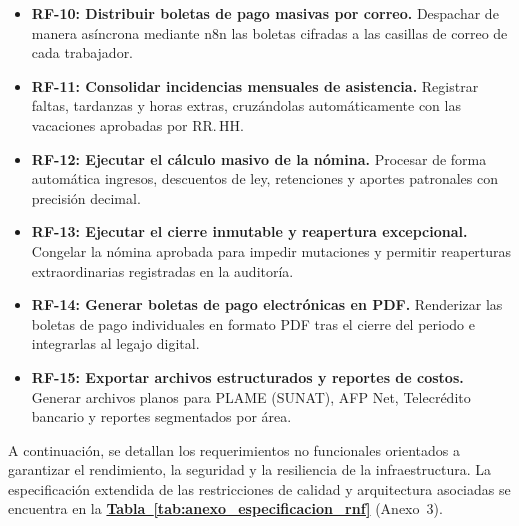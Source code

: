 \begin{itemize}
    \item \textbf{RF-10: Distribuir boletas de pago masivas por correo.} Despachar de manera asíncrona mediante n8n las boletas cifradas a las casillas de correo de cada trabajador.
    \item \textbf{RF-11: Consolidar incidencias mensuales de asistencia.} Registrar faltas, tardanzas y horas extras, cruzándolas automáticamente con las vacaciones aprobadas por RR.\,HH.
    \item \textbf{RF-12: Ejecutar el cálculo masivo de la nómina.} Procesar de forma automática ingresos, descuentos de ley, retenciones y aportes patronales con precisión decimal.
    \item \textbf{RF-13: Ejecutar el cierre inmutable y reapertura excepcional.} Congelar la nómina aprobada para impedir mutaciones y permitir reaperturas extraordinarias registradas en la auditoría.
    \item \textbf{RF-14: Generar boletas de pago electrónicas en PDF.} Renderizar las boletas de pago individuales en formato PDF tras el cierre del periodo e integrarlas al legajo digital.
    \item \textbf{RF-15: Exportar archivos estructurados y reportes de costos.} Generar archivos planos para PLAME (SUNAT), AFP Net, Telecrédito bancario y reportes segmentados por área.
\end{itemize}


A continuación, se detallan los requerimientos no funcionales orientados a garantizar el rendimiento, 
la seguridad y la resiliencia de la infraestructura. La especificación extendida de las restricciones de calidad y arquitectura asociadas 
se encuentra en la \textbf{\hyperref[tab:anexo_especificacion_rnf]{Tabla~\ref{tab:anexo_especificacion_rnf}}} (Anexo~3).

